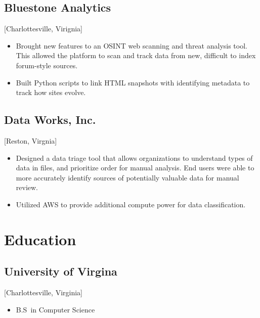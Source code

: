 \documentclass{mycv}
\begin{document}
\subsection{Bluestone Analytics}[Charlottesville, Virignia]
\begin{positions}
\end{positions}
\begin{itemize}
  \item Brought new features to an OSINT web scanning and threat analysis tool. This allowed the platform to scan and track data from new, difficult to index forum-style sources.
  \item Built Python scripts to link HTML snapshots with identifying metadata to track how sites evolve.
\end{itemize}

\subsection{Data Works, Inc.}[Reston, Virgnia]
\begin{positions}
\end{positions}
\begin{itemize}
  \item Designed a data triage tool that allows organizations to understand types of data in files, and prioritize order for manual analysis. End users were able to more accurately identify sources of potentially valuable data for manual review.
  \item Utilized AWS to provide additional compute power for data classification.
\end{itemize}

\section{Education}

\subsection{University of Virgina}[Charlottesville, Virginia]
\vspace{-\parskip}%
\begin{itemize}[label={}]
  \item B.S\ in Computer Science 
\end{itemize}
\end{document}
